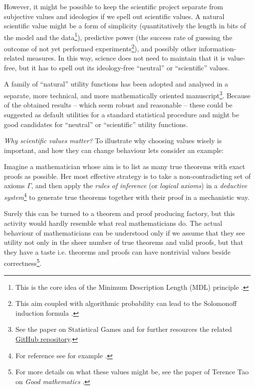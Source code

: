\documentclass{article}
\begin{document}
However, it might be possible to keep the scientific project separate from subjective values and ideologies if we spell out scientific values. A natural scientific value might be a form of simplicity (quantitatively the length in bits of the model and the data\footnote{This is the core idea of the Minimum Description Length (MDL) principle \cite{paper:MinimumDescriptionLengthRevisited,book:MinimumDescriptionLength}.}), predictive power (the success rate of guessing the outcome of not yet performed experiments\footnote{This aim coupled with algorithmic probability \cite{book:LiVitanyi} can lead to the Solomonoff induction formula \cite{book:Solomonoff,book:UniversalArtificialIntelligence}.}), and possibly other information-related measures. In this way, science does not need to maintain that it is value-free, but it has to spell out its ideology-free ``neutral'' or ``scientific'' values.

A family of ``natural'' utility functions has been adopted and analysed in a separate, more technical, and more mathematically oriented manuscript\footnote{See the paper on Statistical Games \cite{arxiv:StatisticalGamesKonczer2024} and for further resources the related \href{https://github.com/Konczer/UncertaintyTheory/tree/main/StatisticalGames}{GitHub repository}.}. Because of the obtained results – which seem robust and reasonable – these could be suggested as default utilities for a standard statistical procedure and might be good candidates for ``neutral'' or ``scientific'' utility functions.

{\it Why scientific values matter?}
To illustrate why choosing values wisely is important, and how they can change behaviour lets consider an example:

Imagine a mathematician whose aim is to list as many true theorems with exact proofs as possible. Her most effective strategy is to take a non-contradicting set of axioms $\Gamma$, and then apply the \emph{rules of inference} (or \emph{logical axioms}) in a \emph{deductive system}\footnote{For reference see for example \cite{sep:ClassicalLogic,book:MathematicalLogic,book:ComputabilityAndLogic}.} to generate true theorems together with their proof in a mechanistic way. 

Surely this can be turned to a theorem and proof producing factory, but this activity would hardly resemble what real mathematicians do. The actual behaviour of mathematicians can be understood only if we assume that they see utility not only in the sheer number of true theorems and valid proofs, but that they have a taste i.e. theorems and proofs can have nontrivial values beside correctness\footnote{For more details on what these values might be, see the paper of Terence Tao on \emph{Good mathematics} \cite{arxiv:GoodMathematics}.}.
\end{document}
